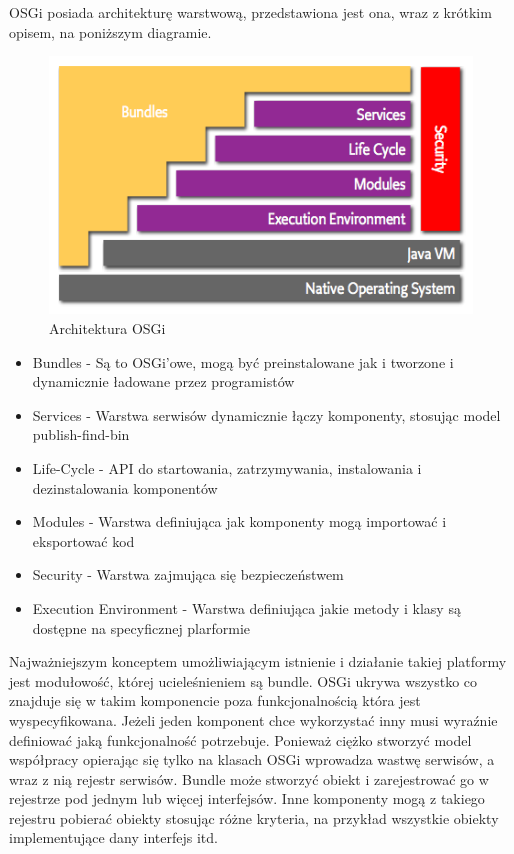 OSGi posiada architekturę warstwową, przedstawiona jest ona, wraz z krótkim opisem, na poniższym diagramie.
\newpage
\begin{figure}[!h]
	\centering
	\includegraphics[scale=0.65]{osgiArchitektura.png} 
	\caption{Architektura OSGi}
\end{figure}
\begin{itemize}
	\item Bundles - Są to OSGi'owe, mogą być preinstalowane jak i tworzone i dynamicznie ładowane przez programistów
	\item Services - Warstwa serwisów dynamicznie łączy komponenty, stosując model publish-find-bin
	\item Life-Cycle - API do startowania, zatrzymywania, instalowania i dezinstalowania komponentów
	\item Modules - Warstwa definiująca jak komponenty mogą importować i eksportować kod	
	\item Security - Warstwa zajmująca się bezpieczeństwem
	\item Execution Environment - Warstwa definiująca jakie metody i klasy są dostępne na specyficznej plarformie
\end{itemize}  
Najważniejszym konceptem umożliwiającym istnienie i działanie takiej platformy jest modułowość, której ucieleśnieniem są bundle. OSGi ukrywa wszystko co znajduje się w takim komponencie poza funkcjonalnością która jest wyspecyfikowana. Jeżeli jeden komponent chce wykorzystać inny musi wyraźnie definiować jaką funkcjonalność potrzebuje. Ponieważ ciężko stworzyć model współpracy opierając się tylko na klasach OSGi wprowadza wastwę serwisów, a wraz z nią rejestr serwisów. Bundle może stworzyć obiekt i zarejestrować go w rejestrze pod jednym lub więcej interfejsów. Inne komponenty mogą z takiego rejestru pobierać obiekty stosując różne kryteria, na przykład wszystkie obiekty implementujące dany interfejs itd.

